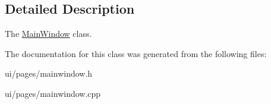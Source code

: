 \subsection{Detailed Description}
The \mbox{\hyperlink{classui_1_1window_1_1_main_window}{Main\+Window}} class. 

The documentation for this class was generated from the following files\+:\begin{DoxyCompactItemize}
\item 
ui/pages/mainwindow.\+h\item 
ui/pages/mainwindow.\+cpp\end{DoxyCompactItemize}
